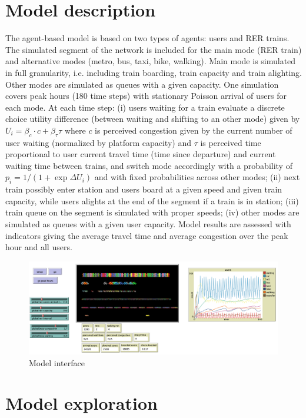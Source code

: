 \documentclass[3p,times,procedia]{elsarticle}
\begin{document}
\section{Model description}

The agent-based model is based on two types of agents: users and RER trains. The simulated segment of the network is included for the main mode (RER train) and alternative modes (metro, bus, taxi, bike, walking). Main mode is simulated in full granularity, i.e. including train boarding, train capacity and train alighting. Other modes are simulated as queues with a given capacity. One simulation covers peak hours (180 time steps) with stationary Poisson arrival of users for each mode. At each time step: (i) users waiting for a train evaluate a discrete choice utility difference (between waiting and shifting to an other mode) given by $U_i = \beta_c \cdot c + \beta_{\tau} \tau$ where $c$ is perceived congestion given by the current number of user waiting (normalized by platform capacity) and $\tau$ is perceived time proportional to user current travel time (time since departure) and current waiting time between trains, and switch mode accordingly with a probability of $p_i = 1 / (1 + \exp \Delta U_i)$ and with fixed probabilities across other modes; (ii) next train possibly enter station and users board at a given speed and given train capacity, while users alights at the end of the segment if a train is in station; (iii) train queue on the segment is simulated with proper speeds; (iv) other modes are simulated as queues with a given user capacity. Model results are assessed with indicators giving the average travel time and average congestion over the peak hour and all users.

\begin{figure}[t]\vspace*{4pt}
\centerline{\includegraphics[width=\linewidth]{figures/Fig2.png}}
\caption{Model interface}
\end{figure}

\section{Model exploration}
\end{document}
